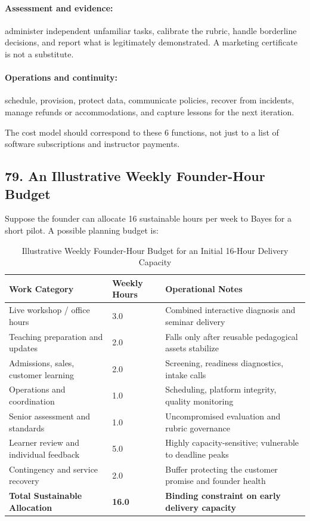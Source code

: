 \paragraph*{Assessment and evidence:} administer independent unfamiliar tasks, calibrate the rubric, handle borderline decisions, and report what is legitimately demonstrated. A marketing certificate is not a substitute.

\paragraph*{Operations and continuity:} schedule, provision, protect data, communicate policies, recover from incidents, manage refunds or accommodations, and capture lessons for the next iteration.

The cost model should correspond to these 6 functions, not just to a list of software subscriptions and instructor payments.

\subsection*{79. An Illustrative Weekly Founder-Hour Budget}

Suppose the founder can allocate 16 sustainable hours per week to Bayes for a short pilot. A possible planning budget is:

\begin{table}[t]
\centering
\small
\caption{Illustrative Weekly Founder-Hour Budget for an Initial 16-Hour Delivery Capacity}
\begin{tabularx}{\textwidth}{p{}p{}X}
\toprule
\textbf{Work Category} & \textbf{Weekly Hours} & \textbf{Operational Notes} \\
\midrule
Live workshop / office hours & 3.0 & Combined interactive diagnosis and seminar delivery \\
Teaching preparation and updates & 2.0 & Falls only after reusable pedagogical assets stabilize \\
Admissions, sales, customer learning & 2.0 & Screening, readiness diagnostics, intake calls \\
Operations and coordination & 1.0 & Scheduling, platform integrity, quality monitoring \\
Senior assessment and standards & 1.0 & Uncompromised evaluation and rubric governance \\
Learner review and individual feedback & 5.0 & Highly capacity-sensitive; vulnerable to deadline peaks \\
Contingency and service recovery & 2.0 & Buffer protecting the customer promise and founder health \\
\midrule
\textbf{Total Sustainable Allocation} & \textbf{16.0} & \textbf{Binding constraint on early delivery capacity} \\
\bottomrule
\end{tabularx}
\end{table}

